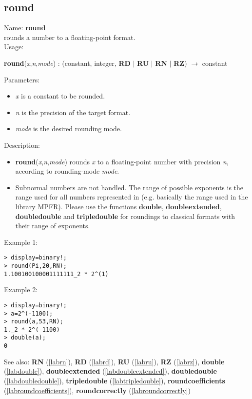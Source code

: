 \subsection{round}
\label{labround}
\noindent Name: \textbf{round}\\
rounds a number to a floating-point format.\\

\noindent Usage: 
\begin{center}
\textbf{round}(\emph{x},\emph{n},\emph{mode}) : (\textsf{constant}, \textsf{integer}, \textbf{RD} $|$ \textbf{RU} $|$ \textbf{RN} $|$ \textbf{RZ}) $\rightarrow$ \textsf{constant}\\
\end{center}
Parameters: 
\begin{itemize}
\item \emph{x} is a constant to be rounded.
\item \emph{n} is the precision of the target format.
\item \emph{mode} is the desired rounding mode.
\end{itemize}
\noindent Description: \begin{itemize}

\item \textbf{round}(\emph{x},\emph{n},\emph{mode}) rounds \emph{x} to a floating-point number with 
   precision \emph{n}, according to rounding-mode \emph{mode}. 

\item Subnormal numbers are not handled. The range of possible exponents is the 
   range used for all numbers represented in \sollya (e.g. basically the range 
   used in the library MPFR). Please use the functions \textbf{double}, \textbf{doubleextended},
   \textbf{doubledouble} and \textbf{tripledouble} for roundings to classical formats with their
   range of exponents.
\end{itemize}
\noindent Example 1: 
\begin{center}\begin{minipage}{15cm}\begin{Verbatim}[frame=single]
> display=binary!;
> round(Pi,20,RN);
1.100100100001111111_2 * 2^(1)
\end{Verbatim}
\end{minipage}\end{center}
\noindent Example 2: 
\begin{center}\begin{minipage}{15cm}\begin{Verbatim}[frame=single]
> display=binary!;
> a=2^(-1100);
> round(a,53,RN);
1._2 * 2^(-1100)
> double(a);
0
\end{Verbatim}
\end{minipage}\end{center}
See also: \textbf{RN} (\ref{labrn}), \textbf{RD} (\ref{labrd}), \textbf{RU} (\ref{labru}), \textbf{RZ} (\ref{labrz}), \textbf{double} (\ref{labdouble}), \textbf{doubleextended} (\ref{labdoubleextended}), \textbf{doubledouble} (\ref{labdoubledouble}), \textbf{tripledouble} (\ref{labtripledouble}), \textbf{roundcoefficients} (\ref{labroundcoefficients}), \textbf{roundcorrectly} (\ref{labroundcorrectly})
